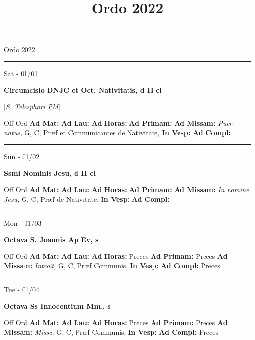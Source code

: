 \documentclass[letterpaper, 10pt]{article}
\title{Ordo 2022}
\begin{document}
\begin{center}
\Huge Ordo 2022\end{center}

\hrule
\begin{center}
Sat - 01/01
\end{center}\textbf{ \large Circumcisio DNJC et Oct. Nativitatis, \textnormal{\normalsize d II cl}}

[\textit{S. Telesphori PM}]
\begin{justify}
Off Ord
\textbf{Ad Mat: }
\textbf{Ad Lau: }
\textbf{Ad Horas: }
\textbf{Ad Primam: }
\textbf{Ad Missam:} \textit{Puer natus, } G, C, Præf et Communicantes de Nativitate, 
\textbf{In Vesp: }
\textbf{Ad Compl: }\end{justify}



\hrule
\begin{center}
Sun - 01/02
\end{center}\textbf{ \large Ssmi Nominis Jesu, \textnormal{\normalsize d II cl}}
\begin{justify}
Off Ord
\textbf{Ad Mat: }
\textbf{Ad Lau: }
\textbf{Ad Horas: }
\textbf{Ad Primam: }
\textbf{Ad Missam:} \textit{In nomine Jesu, } G, C, Præf de Nativitate, 
\textbf{In Vesp: }
\textbf{Ad Compl: }\end{justify}



\hrule
\begin{center}
Mon - 01/03
\end{center}\textbf{ \large Octava S. Joannis Ap Ev, \textnormal{\normalsize s}}
\begin{justify}
Off Ord
\textbf{Ad Mat: }
\textbf{Ad Lau: }
\textbf{Ad Horas: }Preces
\textbf{Ad Primam: }Preces
\textbf{Ad Missam:} \textit{Introit, } G, C, Præf Communis, 
\textbf{In Vesp: }
\textbf{Ad Compl: }Preces\end{justify}



\hrule
\begin{center}
Tue - 01/04
\end{center}\textbf{ \large Octava Ss Innocentium Mm., \textnormal{\normalsize s}}
\begin{justify}
Off Ord
\textbf{Ad Mat: }
\textbf{Ad Lau: }
\textbf{Ad Horas: }Preces
\textbf{Ad Primam: }Preces
\textbf{Ad Missam:} \textit{Missa, } G, C, Præf Communis, 
\textbf{In Vesp: }
\textbf{Ad Compl: }Preces\end{justify}
\end{document}
